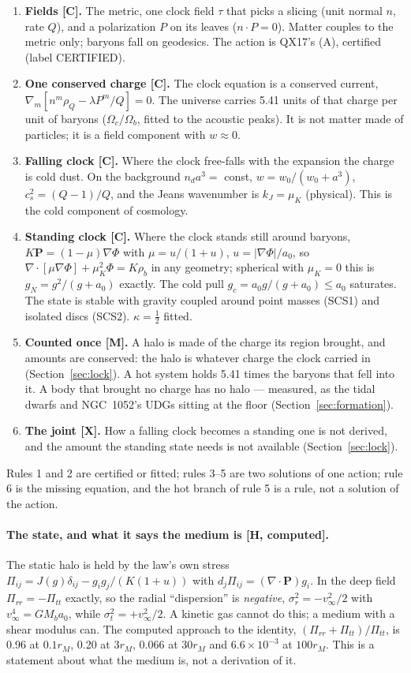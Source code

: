 \documentclass[10pt]{article}
\begin{document}
\begin{enumerate}
\item \textbf{Fields [C].} The metric, one clock field $\tau$ that picks a slicing (unit normal $n$, rate $Q$),
  and a polarization $P$ on its leaves ($n\!\cdot\!P=0$). Matter couples to the metric only; baryons fall on
  geodesics. The action is QX17's (A), certified (label CERTIFIED).
\item \textbf{One conserved charge [C].} The clock equation is a conserved current,
  $\nabla_m[n^m\rho_Q-\lambda P^m/Q]=0$. The universe carries 5.41 units of that charge per unit of baryons
  ($\Omega_c/\Omega_b$, fitted to the acoustic peaks). It is not matter made of particles; it is a field
  component with $w\approx0$.
\item \textbf{Falling clock [C].} Where the clock free-falls with the expansion the charge is cold dust. On the
  background $n_da^3=$ const, $w=w_0/(w_0+a^3)$, $c_s^2=(Q-1)/Q$, and the Jeans wavenumber is $k_J=\mu_K$
  (physical). This is the cold component of cosmology.
\item \textbf{Standing clock [C].} Where the clock stands still around baryons, $K\mathbf P=(1-\mu)\nabla\Phi$
  with $\mu=u/(1+u)$, $u=|\nabla\Phi|/a_0$, so
  $\nabla\!\cdot[\mu\nabla\Phi]+\mu_K^2\Phi=K\rho_b$ in any geometry; spherical with $\mu_K=0$ this is
  $g_N=g^2/(g+a_0)$ exactly. The cold pull $g_c=a_0g/(g+a_0)\le a_0$ saturates. The state is stable with
  gravity coupled around point masses (SCS1) and isolated discs (SCS2). $\kappa=\tfrac12$ fitted.
\item \textbf{Counted once [M].} A halo is made of the charge its region brought, and amounts are conserved:
  the halo is whatever charge the clock carried in (Section~\ref{sec:lock}). A hot system holds 5.41 times the
  baryons that fell into it. A body that brought no charge has no halo --- measured, as the tidal dwarfs and
  NGC~1052's UDGs sitting at the floor (Section~\ref{sec:formation}).
\item \textbf{The joint [X].} How a falling clock becomes a standing one is not derived, and the amount the
  standing state needs is not available (Section~\ref{sec:lock}).
\end{enumerate}
Rules 1 and 2 are certified or fitted; rules 3--5 are two solutions of one action; rule 6 is the missing
equation, and the hot branch of rule 5 is a rule, not a solution of the action.

\paragraph{The state, and what it says the medium is [H, computed].}
The static halo is held by the law's own stress
$\Pi_{ij}=J(g)\delta_{ij}-g_ig_j/(K(1+u))$ with $d_j\Pi_{ij}=(\nabla\!\cdot\!\mathbf P)g_i$. In the deep field
$\Pi_{rr}=-\Pi_{tt}$ exactly, so the radial ``dispersion'' is {\it negative}, $\sigma_r^2=-v_\infty^2/2$ with
$v_\infty^4=GM_ba_0$, while $\sigma_t^2=+v_\infty^2/2$. A kinetic gas cannot do this; a medium with a shear
modulus can. The computed approach to the identity, $(\Pi_{rr}+\Pi_{tt})/\Pi_{tt}$, is 0.96 at $0.1r_M$, 0.20 at
$3r_M$, 0.066 at $30r_M$ and $6.6\times10^{-3}$ at $100r_M$. This is a statement about what the medium is, not a
derivation of it.
\end{document}
